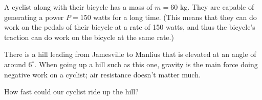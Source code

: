\documentclass[12pt]{article}
\begin{document}
A cyclist along with their bicycle has a mass of $m=60$ kg. They are capable of generating a power $P=150$ watts for a long time. (This means that they can do work on the pedals of their bicycle at a rate of 150 watts, and thus the bicycle's traction can do work on the bicycle at the same rate.)

There is a hill leading from Jamesville to Manlius that is elevated at an angle of around $6^\circ$. When going up a hill such as this one, gravity is the main force doing negative work on a cyclist; air resistance doesn't matter much. 

How fast could our cyclist ride up the hill?


 
\end{document}

